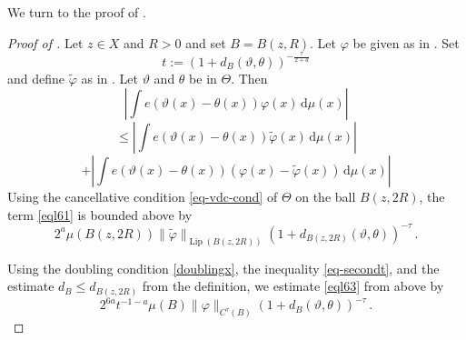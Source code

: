 \documentclass[10pt,a4paper]{article}
\theoremstyle{plain}
\theoremstyle{definition}
\numberwithin{equation}{subsection}
\DeclareMathOperator{\Lip}{\operatorname{Lip}}
\newcommand{\mfa}{{\vartheta}}
\newcommand{\mfb}{{\theta}}
\newcommand{\Mf}{{\Theta}}
\newcommand{\proves}[1]{}
\newcommand{\leanok}{}
\begin{document}
We turn to the proof of .
\begin{proof}[Proof of ]
    \proves{Holder-van-der-Corput}\leanok
Let $z\in X$ and $R>0$ and set $B=B(z,R)$. Let $\varphi$
be given as in .
Set
\begin{equation}\label{eql69}
    t:=(1+d_B(\mfa,\mfb))^{-\frac{\tau}{2+a}}
\end{equation}
and define $\tilde{\varphi}$ as in . Let $\mfa$ and $\mfb$ be in $\Mf$.
Then
   \begin{equation}\label{eql60}
       \left|\int e(\mfa(x)-{\mfb(x)}) \varphi (x)\, \mathrm{d}\mu(x)\right|
   \end{equation}
    \begin{equation}\label{eql61}
   \le \left|\int e(\mfa(x)-{\mfb(x)}) \tilde{\varphi} (x)\, \mathrm{d}\mu(x)\right|
   \end{equation}
         \begin{equation}\label{eql62}
     + \left|\int e(\mfa(x)-{\mfb(x)}) (\varphi (x)-\tilde{\varphi}(x))\, \mathrm{d}\mu(x)\right|
   \end{equation}
Using the cancellative condition \eqref{eq-vdc-cond} of $\Mf$ on the ball $B(z,2R)$, the term \eqref{eql61} is bounded above by
 \begin{equation}\label{eql63}
       2^a \mu(B(z,2R)) \|\tilde{\varphi}\|_{\Lip(B(z,2R))} (1 + d_{B(z,2R)}(\mfa,\mfb))^{-\tau} \, .
 \end{equation}



Using the doubling condition \eqref{doublingx},
the inequality \eqref{eq-secondt}, and the estimate
$d_B\le d_{B(z,2R)}$ from the definition,
we estimate \eqref{eql63} from above by
\begin{equation}\label{eql64}
       2^{6a}t^{-1-a} \mu(B) \|{\varphi}\|_{C^\tau(B)}
       (1 + d_{B}(\mfa,\mfb))^{-\tau} \, .
 \end{equation}


\end{proof}
\end{document}
